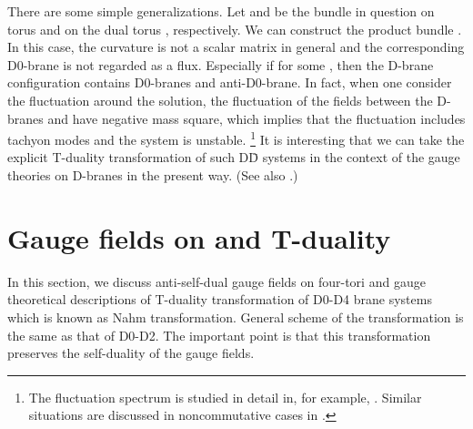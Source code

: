 \documentclass[a4paper,epsf,12pt]{article}
\providecommand{\Th}{\hat{T}}
\def \Eh{\hat{E}}
\begin{document}
There are some simple generalizations.
Let \coordHE{} and \myHighlight{$\Eh_{(k,N)}$}\coordHE{}
be the bundle in question 
on torus \coordHE{} and on the dual torus \myHighlight{$\Th^2$}\coordHE{}, respectively. 
We can construct 
the product bundle \coordHE{}.
In this case, the curvature is not a scalar matrix in general 
and the corresponding D0-brane is not regarded as a flux.
Especially if \coordHE{} for some \coordHE{}, then
the D-brane configuration contains \coordHE{} D0-branes and \coordHE{}
anti-D0-brane. In fact, 
when one consider the fluctuation around the solution, 
the fluctuation of the fields between the D-branes \coordHE{} and 
\coordHE{} have negative mass square, 
which implies that the fluctuation includes tachyon modes 
and the system is unstable.
\footnote{The fluctuation spectrum is studied in
detail in, for example, \cite{vanBaal2, Troost}. 
Similar situations are discussed in noncommutative cases in \cite{Ko}.} 
It is interesting that we can take the explicit T-duality transformation
of such D\=D systems in the context of the gauge theories on D-branes
in the present way.
(See also \cite{Hori}.)

\section{Gauge fields on \coordHE{} and T-duality}

In this section, we discuss anti-self-dual 
gauge fields on four-tori \coordHE{} and 
gauge theoretical descriptions of T-duality transformation
of D0-D4 brane systems which is known as Nahm transformation.
General scheme of the transformation is the same as that of D0-D2.
The important point is that this transformation
preserves the self-duality of the gauge fields.
\end{document}
